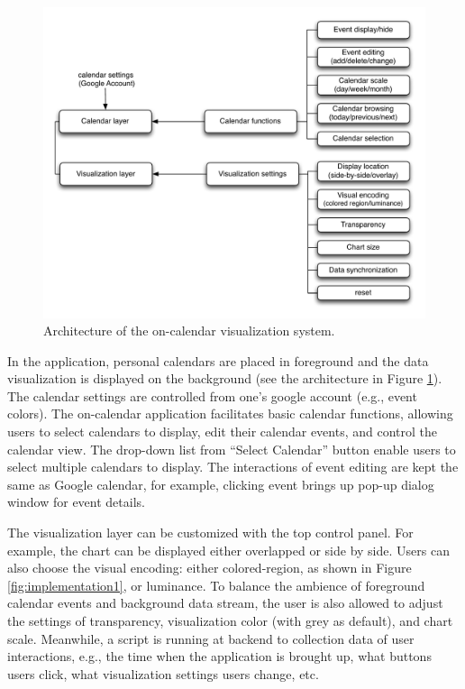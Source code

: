 \documentclass[12pt,oneside]{book}
\begin{document}
\begin{figure}[h]
\centering
\includegraphics[width=\columnwidth]{figures/designComp}
\caption{Architecture of the on-calendar visualization system.}
\label{fig:archi}
\end{figure}

In the application, personal calendars are placed in foreground and the data visualization is displayed on the background (see the architecture in Figure \ref{fig:archi}). The calendar settings are controlled from one's google account (e.g., event colors). The on-calendar application facilitates basic calendar functions, allowing users to select calendars to display, edit their calendar events, and control the calendar view. The drop-down list from ``Select Calendar'' button enable users to select multiple calendars to display. The interactions of event editing are kept the same as Google calendar, for example, clicking event brings up pop-up dialog window for event details.

The visualization layer can be customized with the top control panel. For example, the chart can be displayed either overlapped or side by side. Users can also choose the visual encoding: either colored-region, as shown in Figure \ref{fig:implementation1}, or luminance. To balance the ambience of foreground calendar events and background data stream, the user is also allowed to adjust the settings of transparency, visualization color (with grey as default), and chart scale. Meanwhile, a script is running at backend to collection data of  user interactions, e.g., the time when the application is brought up, what buttons users click, what visualization settings users change, etc.
\end{document}
